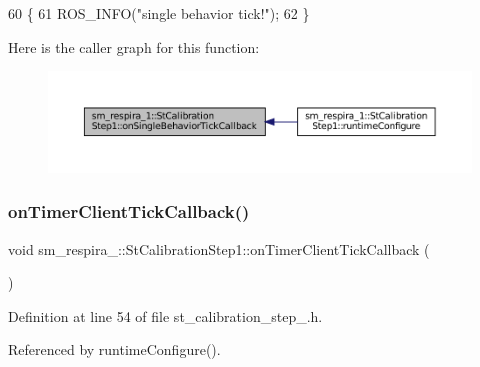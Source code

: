 \begin{DoxyCode}
60     \{
61         ROS\_INFO(\textcolor{stringliteral}{"single behavior tick!"});
62     \}
\end{DoxyCode}
Here is the caller graph for this function\+:
\nopagebreak
\begin{figure}[H]
\begin{center}
\leavevmode
\includegraphics[width=350pt]{structsm__respira__1_1_1StCalibrationStep1_a5753db04586e997320c8e3916c6c2642_icgraph}
\end{center}
\end{figure}
\mbox{\label{structsm__respira__1_1_1StCalibrationStep1_a0076674470e3964b263531f3f41c73e6}} 
\subsubsection{\texorpdfstring{on\+Timer\+Client\+Tick\+Callback()}{onTimerClientTickCallback()}}
{\footnotesize\ttfamily void sm\+\_\+respira\+\_\+::\+St\+Calibration\+Step1\+::on\+Timer\+Client\+Tick\+Callback (\begin{DoxyParamCaption}{ }\end{DoxyParamCaption})\hspace{0.3cm}{\ttfamily [inline]}}



Definition at line 54 of file st\+\_\+calibration\+\_\+step\+\_.\+h.



Referenced by runtime\+Configure().


